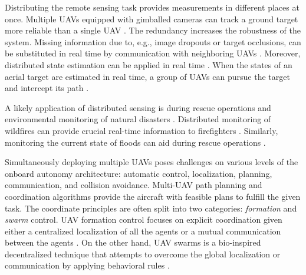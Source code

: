 \documentclass[a4paper,11pt,twoside,openright]{book}
\begin{document}
Distributing the remote sensing task provides measurements in different places at once.
Multiple UAVs equipped with gimballed cameras can track a ground target more reliable than a single \ac{UAV} \cite{sun2014distributed}.
The redundancy increases the robustness of the system.
Missing information due to, e.g., image dropouts or target occlusions, can be substituted in real time by communication with neighboring \acp{UAV} \cite{baek2020optimal, farmani2015tracking}.
Moreover, distributed state estimation can be applied in real time \cite{capitan2009delayed, merino2007multi, wan2000unscented}.
When the states of an aerial target are estimated in real time, a group of \acp{UAV} can pursue the target and intercept its path \cite{zhu2017distributed}.

A likely application of distributed sensing is during rescue operations and environmental monitoring of natural disasters \cite{manfreda2018use}.
Distributed monitoring of wildfires can provide crucial real-time information to firefighters \cite{yuan2015survey, pham2020distributed}.
Similarly, monitoring the current state of floods can aid during rescue operations \cite{karamuz2020use, perks2016advances}.

Simultaneously deploying multiple \acp{UAV} poses challenges on various levels of the onboard autonomy architecture: automatic control, localization, planning, communication, and collision avoidance.
Multi-\ac{UAV} path planning and coordination algorithms provide the aircraft with feasible plans to fulfill the given task.
The coordinate principles are often split into two categories: \emph{formation} and \emph{swarm} control.
\ac{UAV} formation control focuses on explicit coordination given either a centralized localization of all the agents or a mutual communication between the agents \cite{kamel2017model, kuriki2014avoidance, rezaee2013motion, wang2015efficient}.
On the other hand, \ac{UAV} swarms is a bio-inspired decentralized technique that attempts to overcome the global localization or communication by applying behavioral rules \cite{mcguire2019minimal, burkle2011towards, saulnier2017flocking}.
\end{document}
